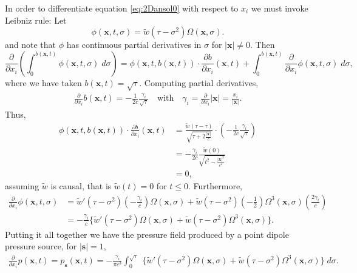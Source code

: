 In order to differentiate equation \ref{eq:2Dansol0} with respect to $x_i$ we must invoke Leibniz rule: Let 
\[ 
   \phi(\mathbf x,t,\sigma) = \tilde w(\tau -\sigma^2)\Omega(\mathbf x,\sigma).
\]
and note that $\phi$ has continuous partial derivatives in $\sigma$ for $|\mathbf x|\neq 0$.
Then
\[
        \frac{\partial}{\partial x_i} \left( \int_{0}^{b(\mathbf x,t)} \phi(\mathbf x,t,\sigma) \; d\sigma \right) = 
        \phi(\mathbf x,t,b(\mathbf x,t)) \cdot \frac{\partial b}{\partial x_i}(\mathbf x,t) +
        \int_{0}^{b(\mathbf x,t)} \frac{\partial}{\partial x_i} \phi(\mathbf x,t,\sigma) \; d\sigma,
\]
where we have taken $b(\mathbf x,t) = \sqrt{\tau}$.
Computing partial derivatives,
\begin{align*}
        \frac{\partial}{\partial x_i} b(\mathbf x,t) = -\frac{1}{2c}\frac{\gamma_i}{\sqrt{\tau}} 
        \quad \text{with} \quad \gamma_i=\frac{\partial}{\partial x_i}|\mathbf x| = \tfrac{x_i}{|\mathbf x|}. 
\end{align*}
Thus,
\begin{align*}
        \phi(\mathbf x,t,b(\mathbf x,t)) \cdot \frac{\partial b}{\partial x_i}(\mathbf x,t) 
                     &= \frac{\tilde w(\tau-\tau)}{ \sqrt{\tau + 2\tfrac{|\mathbf x|}{c}} } \cdot  
                        \left( -\frac{1}{2c} \frac{\gamma_i}{\sqrt{\tau}} \right) \\
                               &= -\frac{\gamma_i}{2c} \frac{\tilde w(0)}{\sqrt{ t^2 - \tfrac{|\mathbf x|^2}{c^2} }}\\
                                  &= 0,
\end{align*}
assuming $\tilde w$ is causal, that is $\tilde w(t)=0$ for $t\le 0$.
Furthermore, 
\begin{align*}
        \frac{\partial}{\partial x_i} \phi(\mathbf x,t,\sigma) &= 
                                 \tilde w'(\tau-\sigma^2) \left( -\frac{\gamma_i}{c}\right) \Omega(\mathbf x,\sigma)
                                                   + \tilde w(\tau-\sigma^2) \left(-\frac{1}{2}\right)  \Omega^3(\mathbf x,\sigma) \left( \frac{2\gamma_i}{c} \right) \\
                                                     &= -\frac{\gamma_i}{c}  
                                                        \Big\{ \tilde w'(\tau-\sigma^2) \Omega(\mathbf x,\sigma) + \tilde w(\tau-\sigma^2)\Omega^3(\mathbf x,\sigma) \Big\}.
\end{align*}
Putting it all together we have the pressure field produced by a point dipole pressure source, for $|\mathbf s| = 1$,
\begin{align}\label{eq:2Dansol1}
        \frac{\partial }{\partial x_i} p(\mathbf x,t) = p_{\mathbf s}(\mathbf x,t) = -\frac{\gamma_i}{\pi c^3}  \int_{0}^{\sqrt{\tau}} \; 
                       \Big\{ \tilde w'(\tau-\sigma^2) \Omega(\mathbf x,\sigma)
                                                + \tilde w(\tau-\sigma^2)\Omega^3(\mathbf x,\sigma) \Big\} \; d\sigma.
\end{align}

